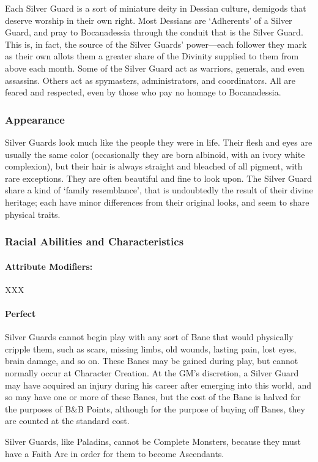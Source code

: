 \documentclass[oneside,11pt,english]{book}
\begin{document}
Each Silver Guard is a sort of miniature deity in Dessian culture, demigods that deserve worship in their 
own right. Most Dessians are ‘Adherents’ of a Silver Guard, and pray to Bocanadessia through the 
conduit that is the Silver Guard. This is, in fact, the source of the Silver Guards' power—each follower 
they mark as their own allots them a greater share of the Divinity supplied to them from above each 
month. Some of the Silver Guard act as warriors, generals, and even assassins. Others act as spymasters, 
administrators, and coordinators. All are feared and respected, even by those who pay no homage to Bocanadessia. 
\subsubsection*{Appearance} 
Silver Guards look much like the people they were in life. Their flesh and eyes are usually the same color 
(occasionally they are born albinoid, with an ivory white complexion), but their hair is always straight and 
bleached of all pigment, with rare exceptions. They are often beautiful and fine to look upon. The Silver 
Guard share a kind of ‘family resemblance’, that is undoubtedly the result of their divine heritage; each 
have minor differences from their original looks, and seem to share physical traits. 
\subsubsection*{Racial Abilities and Characteristics} 
\paragraph{Attribute Modifiers:} XXX 
\paragraph{Perfect}
Silver Guards cannot begin play with any sort of Bane that would physically cripple them, such 
as scars, missing limbs, old wounds, lasting pain, lost eyes, brain damage, and so on. These Banes 
may be gained during play, but cannot normally occur at Character Creation. At the GM's 
discretion, a Silver Guard may have acquired an injury during his career after emerging into this 
world, and so may have one or more of these Banes, but the cost of the Bane is halved for the 
purposes of B\&B Points, although for the purpose of buying off Banes, they are counted at the 
standard cost. 


Silver Guards, like Paladins, cannot be Complete Monsters, because they must have a Faith Arc
in order for them to become Ascendants. 
\end{document}
